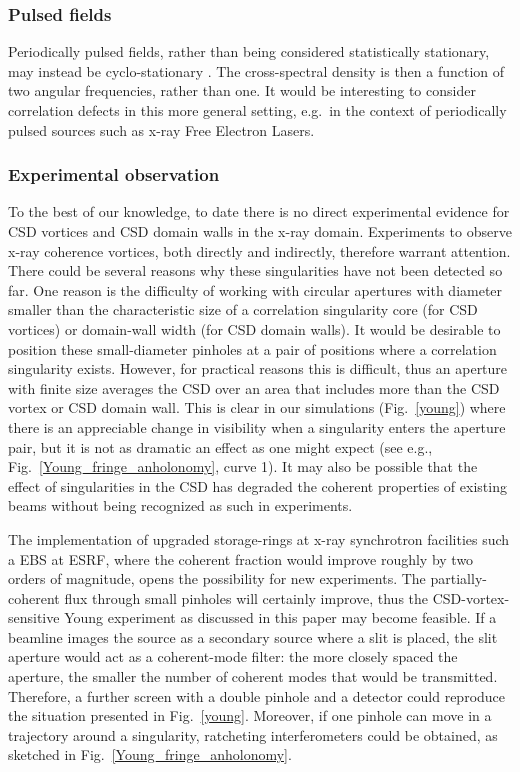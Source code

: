 \documentclass[%
 reprint,
 amsmath,amssymb,
 aps,
]{revtex4-1}
\begin{document}
\subsubsection{Pulsed fields}

Periodically pulsed fields, rather than being considered statistically stationary, may instead be cyclo-stationary \cite{Gardner,Schoonover2009}.  The cross-spectral density is then a function of two angular frequencies, rather than one.  It would be interesting to consider correlation defects in this more general setting, e.g.~in the context of periodically pulsed sources such as x-ray Free Electron Lasers.  

\subsubsection{Experimental observation} 

To the best of our knowledge, to date there is no direct experimental evidence for CSD vortices and CSD domain walls in the x-ray domain.  Experiments to observe x-ray coherence vortices, both directly and indirectly, therefore warrant  attention. There could be several reasons why these singularities have not been detected so far. One reason is the difficulty of working with circular apertures with diameter smaller than the characteristic size of a correlation singularity core (for CSD vortices) or domain-wall width (for CSD domain walls). It would be desirable to position these small-diameter pinholes at a pair of positions where a correlation singularity exists. However, for practical reasons this is difficult, thus an aperture with finite size averages the CSD over an area that includes more than the CSD vortex or CSD domain wall. This is clear in our simulations ({Fig.~\ref{young}}) where there is an appreciable change in visibility when a singularity enters the aperture pair, but it is not as dramatic an effect as one might expect (see e.g., {Fig.~\ref{Young_fringe_anholonomy}}, curve 1). It may also be possible that the effect of singularities in the CSD has degraded the coherent properties of existing beams without being recognized as such in experiments. 

The implementation of upgraded storage-rings at x-ray synchrotron facilities such a EBS at ESRF, where the coherent fraction would improve roughly by two orders of magnitude, opens the possibility for new experiments. The partially-coherent flux through small pinholes will certainly improve, thus the CSD-vortex-sensitive Young experiment as discussed in this paper may become feasible. If a beamline images the source as a secondary source where a slit is placed, the slit aperture would act as a coherent-mode filter: the more closely spaced the aperture, the smaller the number of coherent modes that would be transmitted. Therefore, a further screen with a double pinhole and a detector could reproduce the situation presented in {Fig.~\ref{young}}. Moreover, if one pinhole can move in a trajectory around a singularity, ratcheting interferometers could be obtained, as sketched in Fig.~\ref{Young_fringe_anholonomy}. 
\end{document}
